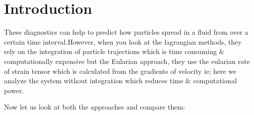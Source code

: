 \documentclass[../report.tex]{subfiles}
\begin{document}
\chapter{Introduction}
These diagnostics can help to predict how particles spread in a fluid from over a certain time interval.However, when you look at the lagrangian methods, they rely on the integration of particle trajections which is time consuming \& computationally expensive but the Eularian approach, they use the eularian rate of strain tensor which is calculated from the gradients of velocity ie; here we analyze the system without integration which reduces time \& computational power.
\par Now let us look at both the approaches and compare them:
\end{document}
